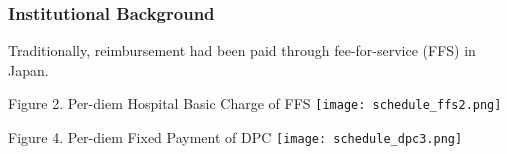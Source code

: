 \documentclass[14pt]{beamer}
\begin{document}
\begin{frame}[allowframebreaks]
\frametitle{Institutional Background}
Traditionally, reimbursement had been paid through fee-for-service (FFS) in Japan.\par
\vspace{5pt}


\framebreak

\begin{center}
{\small Figure 2. Per-diem Hospital Basic Charge of FFS}
\texttt{[image: schedule\_ffs2.png]}
\end{center}

\framebreak

\vspace{5pt}



\framebreak

\begin{center}
{\small Figure 4. Per-diem Fixed Payment of DPC}
\texttt{[image: schedule\_dpc3.png]}
\end{center}
\end{frame}
\end{document}

